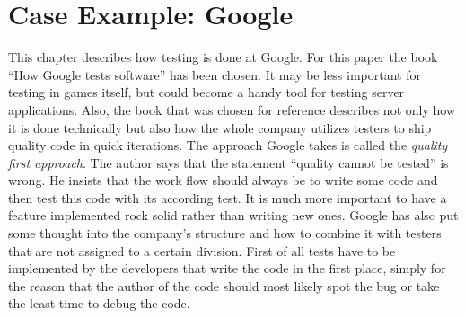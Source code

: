 \section{Case Example: Google} \label{sec:TestingAtGoogle}
    This chapter describes how testing is done at Google. For this paper the book ``How Google tests software'' \cite[]{whittaker2012google} has been chosen. It may be less important for testing in games itself, but could become a handy tool for testing server applications.
    Also, the book that was chosen for reference describes not only how it is done technically but also how the whole company utilizes testers to ship quality code in quick iterations. 
    The approach Google takes is called the \textit{quality first approach}. 
    The author says that the statement ``quality cannot be tested'' is wrong. He insists that the work flow should always be to write some code and then test this code with its according test. It is much more important to have a feature implemented rock solid rather than writing new ones. Google has also put some thought into the company's structure and how to combine it with testers that are not assigned to a certain division. First of all tests have to be implemented by the developers that write the code in the first place, simply for the reason that the author of the code should most likely spot the bug or take the least time to debug the code. 

